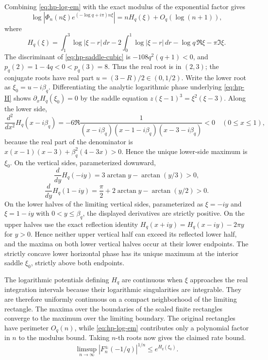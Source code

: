 Combining \eqref{eq:hp-log-em} with the exact modulus of the exponential
factor gives
\[
 \log|\Phi_n(n\xi)e^{(-\log q+i\pi)n\xi}|
       =nH_q(\xi)+O_q(\log(n+1)),
\]
where
\begin{equation}\label{eq:hp-H}
 H_q(\xi)=\int_1^3\log|\xi-r|\,dr-2\int_0^1\log|\xi-r|\,dr
          -\log q\,\Re\xi-\pi\Im\xi.
\end{equation}
The discriminant of \eqref{eq:hp-saddle-cubic} is
$-108q^2(q+1)<0$, and
$p_q(2)=1-4q<0<p_q(3)=8$.  Thus the real root is in $(2,3)$; the
conjugate roots have real part $u=(3-R)/2\in(0,1/2)$.  Write the lower
root as $\xi_0=u-i\beta_q$.  Differentiating the analytic logarithmic
phase underlying \eqref{eq:hp-H} shows $\partial_xH_q(\xi_0)=0$ by the
saddle equation $z(\xi-1)^3=\xi^2(\xi-3)$.  Along the lower side,
\[
 \frac{d^2}{dx^2}H_q(x-i\beta_q)
 =-6\Re\frac1{(x-i\beta_q)(x-1-i\beta_q)(x-3-i\beta_q)}<0
 \quad(0\le x\le1),
\]
because the real part of the denominator is
$x(x-1)(x-3)+\beta_q^2(4-3x)>0$.  Hence the unique lower-side maximum is
$\xi_0$.  On the vertical sides, parameterized downward,
\[
 \frac d{dy}H_q(-iy)=3\arctan y-\arctan(y/3)>0,
\]
\[
 \frac d{dy}H_q(1-iy)=\frac\pi2+2\arctan y-\arctan(y/2)>0.
\]
On the lower halves of the limiting vertical sides, parameterized as
$\xi=-iy$ and $\xi=1-iy$ with $0<y\le\beta_q$, the displayed derivatives
are strictly positive.  On the upper halves use the exact reflection identity
$H_q(x+iy)=H_q(x-iy)-2\pi y$ for $y>0$.  Hence neither upper vertical half
can exceed its reflected lower half, and the maxima on both lower vertical
halves occur at their lower endpoints.  The strictly concave lower horizontal
phase has its unique maximum at the interior saddle $\xi_0$, strictly above
both endpoints.

The logarithmic potentials defining $H_q$ are continuous when $\xi$ approaches
the real integration intervals because their logarithmic singularities are
integrable.  They are therefore uniformly continuous on a compact
neighborhood of the limiting rectangle.  The maxima over the boundaries of
the scaled finite rectangles converge to the maximum over the limiting
boundary.  The original rectangles have perimeter $O_q(n)$, while
\eqref{eq:hp-log-em} contributes only a polynomial factor in $n$ to the
modulus bound.  Taking $n$-th roots now gives
the claimed rate bound.
\begin{equation}\label{eq:hp-F-rate}
 \limsup_{n\to\infty}|F_n^\pm(-1/q)|^{1/n}\le e^{H_q(\xi_0)}.
\end{equation}


